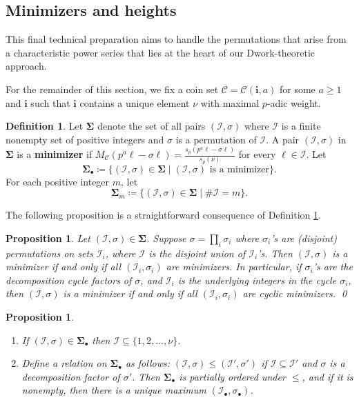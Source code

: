 \documentclass{amsart}
\numberwithin{equation}{section}
\newcommand{\bSig}{\mathbf\Sigma}
\newcommand{\Sb}{\bSig_\bullet}
\newcommand{\Ib}{\cI_\bullet}
\newcommand{\sbb}{\sigma_\bullet}
\newcommand{\cC}{\mathcal{C}}
\newcommand{\cI}{\mathcal{I}}
\newcommand{\bi}{\mathbf{i}}
\theoremstyle{plain}
\newtheorem{proposition}[theorem]{Proposition}
\theoremstyle{definition}
\newtheorem{definition}[theorem]{Definition}
\begin{document}
\subsection{Minimizers and heights}
\label{S:4.3}
This final technical preparation aims to handle the
permutations that arise from a characteristic power series
that lies at the heart of our Dwork-theoretic approach.

For the remainder of this section, we fix a coin set
$\cC=\cC(\bi,a)$ for some $a\ge 1$ and $\bi$ such that 
$\bi$ contains a unique element $\nu$
with maximal $p$-adic weight.

\begin{definition}
\label{D:minimizer}
Let $\bSig$ denote the set of all pairs $(\cI,\sigma)$ 
where $\cI$ is a finite nonempty set of positive integers
and $\sigma$ is a permutation of $\cI$.
A pair $(\cI,\sigma)$ in $\bSig$ is a {\bf minimizer}  if 
$M_\cC(p^a\ell - \sigma \ell) = \frac{s_p(p^a \ell -
    \sigma\ell)}{s_p(\nu)}$ for every $\ell \in \cI$. 
Let $$\Sb \coloneqq \{(\cI,\sigma)\in \bSig \mid (\cI,\sigma) \mbox{ is a minimizer}\}.$$
For each positive integer $m$, 
let 
$$\bSig_m \coloneqq \{(\cI,\sigma)\in\bSig \mid \#\cI=m\}.
$$
\end{definition}

The following proposition is a straightforward consequence of
Definition \ref{D:minimizer}.
\begin{proposition}
\label{P:hereditary}
Let $(\cI,\sigma)\in \bSig$.
Suppose $\sigma=\prod_i \sigma_i$ where $\sigma_i$'s are (disjoint) permutations on sets $\cI_i$, where $\cI$ is the disjoint union of $\cI_i$'s.
Then $(\cI,\sigma)$ is a minimizer if and only if all $(\cI_i, \sigma_i)$ are minimizers.
In particular, if $\sigma_i$'s are the decomposition cycle factors of $\sigma$, and $\cI_i$ is the underlying integers in the cycle $\sigma_i$,
then $(\cI,\sigma)$ is a minimizer if and only if
all $(\cI_i,\sigma_i)$ are cyclic minimizers. \qed
\end{proposition}

\begin{proposition}
\label{P:bounded_min}
\-
\begin{enumerate}

\item  If $(\cI,\sigma)\in \Sb$ then $\cI\subseteq \{1,2,\ldots,\nu\}$.

\item Define a relation on $\Sb$ as follows: $(\cI,\sigma)\le (\cI',\sigma')$ if 
$\cI \subseteq \cI'$ and $\sigma$ is a decomposition factor of $\sigma'$. 
Then $\Sb$ is partially ordered under $\le$, and if it is nonempty,
then there is a unique maximum $(\Ib,\sbb)$.
\end{enumerate}
\end{proposition}
\end{document}
